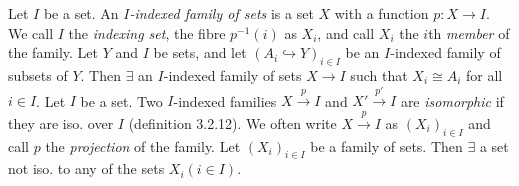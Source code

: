  Let $I$ be a set. An \textit{$I$-indexed family of sets} is a set $X$ with a function $p \colon X \to I$. We call $I$ the \textit{indexing set}, the fibre $p^{-1}(i)$ as $X_i$, and call $X_i$ the $i$th \textit{member} of the family.
 Let $Y$ and $I$ be sets, and let $(A_i \hookrightarrow Y)_{i \in I}$ be an $I$-indexed family of subsets of $Y$. Then $\exists$ an $I$-indexed family of sets $X \to I$ such that $X_i \cong A_i$ for all $i \in I$.
 Let $I$ be a set. Two $I$-indexed families $X \xrightarrow{p} I$ and $X' \xrightarrow{p'} I$ are \textit{isomorphic} if they are iso. over $I$ (definition 3.2.12). We often write $X \xrightarrow{p} I$ as $(X_i)_{i \in I}$ and call $p$ the \textit{projection} of the family.
 Let $(X_i)_{i \in I}$ be a family of sets. Then $\exists$ a set not iso. to any of the sets $X_i (i \in I)$.
